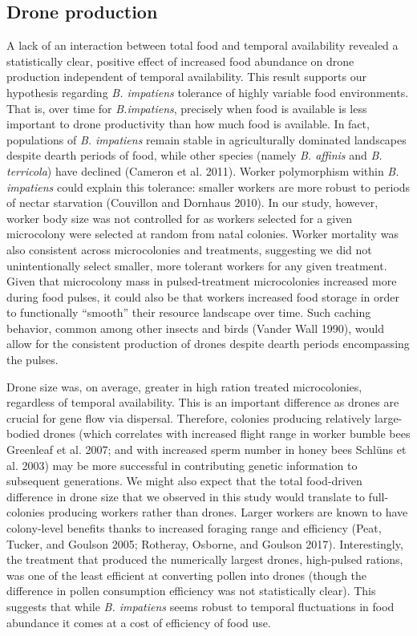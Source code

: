 \documentclass[11pt,]{article}
\begin{document}
\hypertarget{drone-production}{%
\subsection{Drone production}\label{drone-production}}

A lack of an interaction between total food and temporal availability
revealed a statistically clear, positive effect of increased food
abundance on drone production independent of temporal availability. This
result supports our hypothesis regarding \emph{B. impatiens} tolerance
of highly variable food environments. That is, over time for
\emph{B.impatiens}, precisely when food is available is less important
to drone productivity than how much food is available. In fact,
populations of \emph{B. impatiens} remain stable in agriculturally
dominated landscapes despite dearth periods of food, while other species
(namely \emph{B. affinis} and \emph{B. terricola}) have declined
(Cameron et al. 2011). Worker polymorphism within \emph{B. impatiens}
could explain this tolerance: smaller workers are more robust to periods
of nectar starvation (Couvillon and Dornhaus 2010). In our study,
however, worker body size was not controlled for as workers selected for
a given microcolony were selected at random from natal colonies. Worker
mortality was also consistent across microcolonies and treatments,
suggesting we did not unintentionally select smaller, more tolerant
workers for any given treatment. Given that microcolony mass in
pulsed-treatment microcolonies increased more during food pulses, it
could also be that workers increased food storage in order to
functionally ``smooth'' their resource landscape over time. Such caching
behavior, common among other insects and birds (Vander Wall 1990), would
allow for the consistent production of drones despite dearth periods
encompassing the pulses.

Drone size was, on average, greater in high ration treated
microcolonies, regardless of temporal availability. This is an important
difference as drones are crucial for gene flow via dispersal. Therefore,
colonies producing relatively large-bodied drones (which correlates with
increased flight range in worker bumble bees Greenleaf et al. 2007; and
with increased sperm number in honey bees Schlüns et al. 2003) may be
more successful in contributing genetic information to subsequent
generations. We might also expect that the total food-driven difference
in drone size that we observed in this study would translate to
full-colonies producing workers rather than drones. Larger workers are
known to have colony-level benefits thanks to increased foraging range
and efficiency (Peat, Tucker, and Goulson 2005; Rotheray, Osborne, and
Goulson 2017). Interestingly, the treatment that produced the
numerically largest drones, high-pulsed rations, was one of the least
efficient at converting pollen into drones (though the difference in
pollen consumption efficiency was not statistically clear). This
suggests that while \emph{B. impatiens} seems robust to temporal
fluctuations in food abundance it comes at a cost of efficiency of food
use.
\end{document}
